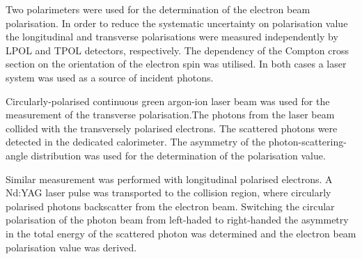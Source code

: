 Two polarimeters were used for the determination of the electron beam polarisation. In order to reduce the systematic uncertainty on polarisation value the longitudinal and transverse polarisations were measured independently by LPOL and TPOL detectors, respectively. The dependency of the Compton cross section on the orientation of the electron spin was utilised. In both cases a laser system was used as a source of incident photons.

Circularly-polarised continuous green argon-ion laser beam was used for the measurement of the transverse polarisation.The photons from the laser beam collided with the transversely polarised electrons. The scattered photons were detected in the dedicated calorimeter. The asymmetry of the photon-scattering-angle distribution was used for the determination of the polarisation value.

Similar measurement was performed with longitudinal polarised electrons. A Nd:YAG laser pulse was transported to the collision region, where circularly polarised photons backscatter from the electron beam. Switching the circular polarisation of the photon beam from left-haded to right-handed the asymmetry in the total energy of the scattered photon was determined and the electron beam polarisation value was derived.
